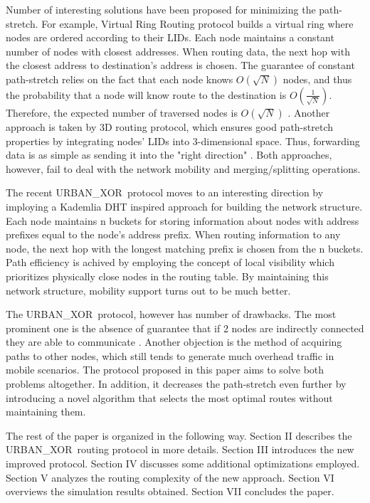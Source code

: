 \documentclass[14pt]{extarticle}
\newcommand{\urbanxor}{URBAN\_XOR}
\begin{document}
Number of interesting solutions have been proposed for minimizing the path-stretch. For example, Virtual Ring Routing protocol builds a virtual ring where nodes are ordered according to their LIDs. Each node maintains a constant number of nodes with closest addresses. When routing data, the next hop with the closest address to destination's address is chosen. The guarantee of constant path-stretch relies on the fact that each node knows $O(\sqrt{N})$ nodes, and thus the probability that a node will know route to the destination is $O(\frac{1}{\sqrt{N}})$. Therefore, the expected number of traversed nodes is $O(\sqrt{N})$ \cite{VRR}. Another approach is taken by 3D routing protocol, which ensures good path-stretch properties by integrating nodes' LIDs into 3-dimensional space. Thus, forwarding data is as simple as sending it into the "right direction" \cite{3drp}. Both approaches, however, fail to deal with the network mobility and merging/splitting operations. 

The recent \urbanxor\ protocol moves to an interesting direction by imploying a Kademlia DHT inspired approach for building the network structure. Each node maintains n buckets for storing information about nodes with address prefixes equal to the node's address prefix. When routing information to any node, the next hop with the longest matching prefix is chosen from the n buckets. Path efficiency is achived by employing the concept of local visibility which prioritizes physically close nodes in the routing table. By maintaining this network structure, mobility support turns out to be much better.

The \urbanxor\ protocol, however has number of drawbacks. The most prominent one is the absence of guarantee that if 2 nodes are indirectly connected they are able to communicate \cite{Pasquini}. Another objection is the method of acquiring paths to other nodes, which still tends to generate much overhead traffic in mobile scenarios. The protocol proposed in this paper aims to solve both problems altogether. In addition, it decreases the path-stretch even further by introducing a novel algorithm that selects the most optimal routes without maintaining them.

The rest of the paper is organized in the following way. Section II describes the \urbanxor\ routing protocol in more details. Section III introduces the new improved protocol. Section IV discusses some additional optimizations employed. Section V analyzes the routing complexity of the new approach. Section VI overviews the simulation results obtained. Section VII concludes the paper.
\end{document}
